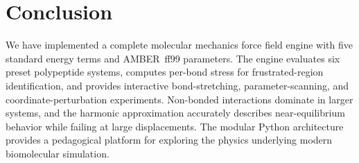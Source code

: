 \documentclass[conference]{IEEEtran}
\begin{document}
\section{Conclusion}

We have implemented a complete molecular mechanics force field engine with five
standard energy terms and AMBER~ff99 parameters.  The engine evaluates six
preset polypeptide systems, computes per-bond stress for frustrated-region
identification, and provides interactive bond-stretching, parameter-scanning,
and coordinate-perturbation experiments.  Non-bonded interactions dominate in
larger systems, and the harmonic approximation accurately describes
near-equilibrium behavior while failing at large displacements.  The modular
Python architecture provides a pedagogical platform for exploring the physics
underlying modern biomolecular simulation.
\end{document}
